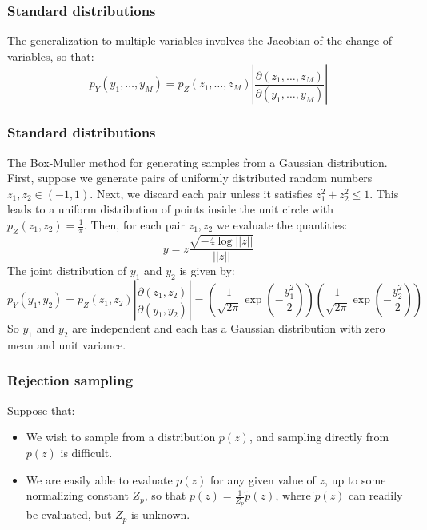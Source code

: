 \documentclass{beamer}
\begin{document}
\begin{frame}
    \frametitle{Standard distributions}
    The generalization to multiple variables involves the Jacobian of the change of variables, so that:
    \begin{equation*}
        p_{Y}(y_{1},\hdots,y_{M})=p_{Z}(z_{1},\hdots,z_{M})|\frac{\partial(z_{1},\hdots,z_{M})}{\partial(y_{1},\hdots,y_{M})}|
    \end{equation*}
\end{frame}

\begin{frame}
    \frametitle{Standard distributions}
    The Box-Muller method for generating samples from a Gaussian distribution. First, suppose we generate pairs of uniformly distributed random numbers $z_{1},z_{2}\in(-1,1)$. Next, we discard each pair unless it satisfies $z_{1}^{2}+z_{2}^{2}\le{}1$. This leads to a uniform distribution of points inside the unit circle with $p_{Z}(z_{1},z_{2})=\frac{1}{\pi}$. Then, for each pair $z_{1},z_{2}$ we evaluate the quantities:
    \begin{equation*}
        y=z\frac{\sqrt{-4\log||z||}}{||z||}
    \end{equation*}
    The joint distribution of $y_{1}$ and $y_{2}$ is given by:
    \begin{equation*}
        p_{Y}(y_{1},y_{2})=p_{Z}(z_{1},z_{2})|\frac{\partial(z_{1},z_{2})}{\partial(y_{1},y_{2})}|=(\frac{1}{\sqrt{2\pi}}\exp(-\frac{y_{1}^{2}}{2}))(\frac{1}{\sqrt{2\pi}}\exp(-\frac{y_{2}^{2}}{2}))
    \end{equation*}
    So $y_{1}$ and $y_{2}$ are independent and each has a Gaussian distribution with zero mean and unit variance.
\end{frame}

\begin{frame}
    \frametitle{Rejection sampling}
    Suppose that:
    \begin{itemize}
        \item We wish to sample from a distribution $p(z)$, and sampling directly from $p(z)$ is difficult.
        \item We are easily able to evaluate $p(z)$ for any given value of $z$, up to some normalizing constant $Z_{p}$, so that $p(z)=\frac{1}{Z_{p}}\tilde{p}(z)$, where $\tilde{p}(z)$ can readily be evaluated, but $Z_{p}$ is unknown.
    \end{itemize}
\end{frame}
\end{document}
